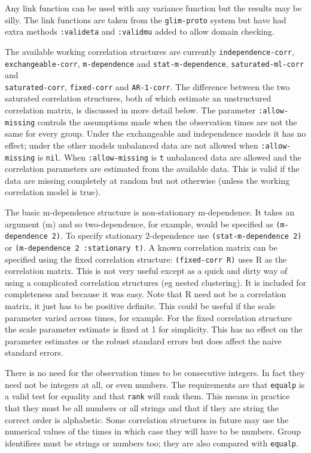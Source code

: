 \documentclass[10pt]{article}
\begin{document}
 Any link function can be used with any variance function but the results may be silly.  The link functions are taken  from the \texttt{glim-proto} system but have had  extra methods \texttt{:valideta} and \texttt{:validmu} added to allow domain checking.

 The available working correlation structures are currently \texttt{independence-corr},\\
 \texttt{exchangeable-corr}, \texttt{m-dependence} and \texttt{stat-m-dependence}, \texttt{saturated-ml-corr} and\\ \texttt{saturated-corr}, \texttt{fixed-corr} and \texttt{AR-1-corr}. The difference between the two saturated correlation structures, both of which estimate an unstructured correlation matrix, is discussed in more detail below.  The parameter \texttt{:allow-missing} controls the assumptions made when the observation times are not the same for every group.  Under the exchangeable and independence models it has no effect; under the other models unbalanced data are not allowed when \texttt{:allow-missing} is \texttt{nil}.  When \texttt{:allow-missing} is \texttt{t} unbalanced data are allowed and the correlation parameters are estimated from the available data. This is valid if the data are missing completely at random but not otherwise (unless the working correlation model is true).

 The basic m-dependence structure is non-stationary m-dependence. It takes an argument (m) and so two-dependence, for example, would be specified as \texttt{(m-dependence 2)}.   To specify stationary 2-dependence use \texttt{(stat-m-dependence 2)} or  \texttt{(m-dependence 2 :stationary t)}.  A known correlation matrix can be specified using the fixed correlation structure: \texttt{(fixed-corr R)} uses R as the correlation matrix.  This is not very useful except as a quick and dirty way of using a  complicated correlation structures (eg nested clustering). It is included for completeness and because it was easy.  Note that R need not be a correlation matrix, it just has to be positive definite. This could be useful if the scale parameter varied across times, for example. For the fixed correlation structure the scale parameter estimate is fixed at 1 for simplicity. This has no effect on the parameter estimates or the robust standard errors but does affect the naive standard errors.

There is no need for the observation times to be consecutive integers. In fact they need not be integers at all, or even numbers. The requirements are that \texttt{equalp} is a valid test for equality and that \texttt{rank} will rank them. This means in practice that they must be all numbers or all strings and that if they are string the correct order is alphabetic.  Some correlation structures in future may use the numerical values of the times in which case they will have to be numbers. 
Group identifiers must be strings or numbers too; they are also compared with \texttt{equalp}. 
\end{document}
